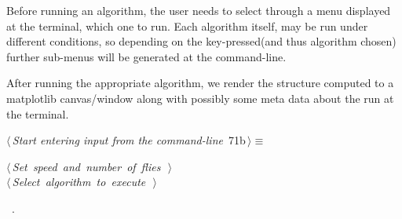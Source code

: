 \documentclass[11.5pt]{report}
\begin{document}
\vspace{-0.8cm}\newchunk Before running an algorithm, the user needs to select through 
a menu displayed at the terminal, which one to run. Each algorithm itself, may be 
run under different conditions, so depending on the key-pressed(and thus algorithm chosen) 
further sub-menus will be generated at the command-line. 

After running the appropriate algorithm, we render the structure computed to a matplotlib canvas/window
along with possibly some meta data about the run at the terminal. 


\begin{flushleft} \small\label{scrap103}\raggedright\small
{} $\langle\,${\itshape Start entering input from the command-line}\nobreak\ {\footnotesize {71b}}$\,\rangle\equiv$
\vspace{-1ex}
\begin{list}{}{} \item
\mbox{}\verb@@\hbox{$\langle\,${\itshape Set speed and number of flies}\nobreak\ {\footnotesize {}}$\,\rangle$}\verb@@\\
\mbox{}\verb@@\hbox{$\langle\,${\itshape Select algorithm to execute}\nobreak\ {\footnotesize {}}$\,\rangle$}\verb@@\\
\mbox{}\verb@@{\NWsep}
\end{list}
\vspace{-1.5ex}
\footnotesize
\begin{list}{}{\setlength{\itemsep}{-\parsep}\setlength{\itemindent}{-\leftmargin}}
\item \NWtxtMacroRefIn\ .

\item{}
\end{list}
\vspace{4ex}
\end{flushleft}
\end{document}
